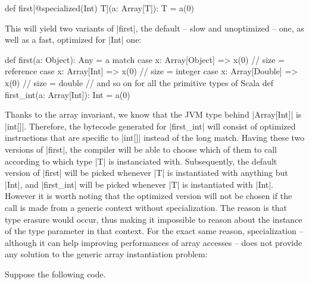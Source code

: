 
\begin{lstlisting-nobreak}
 def first[@specialized(Int) T](a: Array[T]): T = a(0)
\end{lstlisting-nobreak}

This will yield two variants of |first|, the default -- slow and unoptimized -- one, as well as a fast, optimized for |Int| one:

\begin{lstlisting-nobreak}
 def first(a: Object): Any =
   a match {
     case x: Array[Object] => x(0) // size = reference
     case x: Array[Int]    => x(0) // size = integer
     case x: Array[Double] => x(0) // size = double
     // and so on for all the primitive types of Scala
   }
 def first_int(a: Array[Int]): Int = a(0)
\end{lstlisting-nobreak}


Thanks to the array invariant, we know that the JVM type behind |Array[Int]| is |int[]|. Therefore, the bytecode generated for |first_int| will consist of optimized instructions that are specific to |int[]| instead of the long match. Having these two versions of |first|, the compiler will be able to choose which of them to call according to which type |T| is instanciated with. Subsequently, the default version of |first| will be picked whenever |T| is instantiated with anything but |Int|, and |first_int| will be picked whenever |T| is instantiated with |Int|. However it is worth noting that the optimized version will not be chosen if the call is made from a generic context without specialization. The reason is that type erasure would occur, thus making it impossible to reason about the instance of the type parameter in that context. For the exact same reason, specialization -- although it can help improving performances of array accesses -- does not provide any solution to the generic array instantiation problem:

Suppose the following code.

